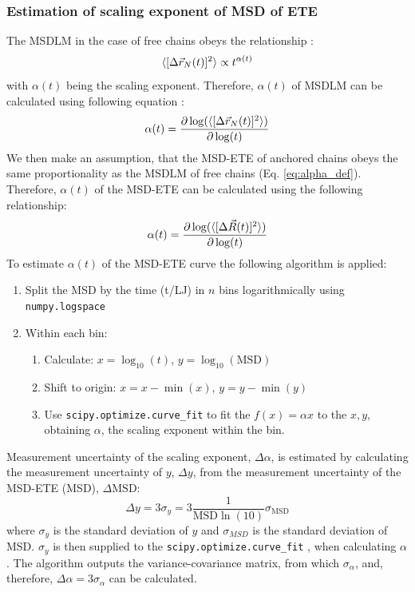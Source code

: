 \documentclass[
    paper=A4,pagesize=automedia,fontsize=12pt,
    BCOR=15mm,DIV=22,
    twoside,headinclude,footinclude=false,
    fleqn,             %
    bibliography=totocnumbered,          %
    listof=totoc,                %
    listof=flat,                 %
    cleardoublepage=empty      %
    numbers=endperiod
]{scrartcl}
\begin{document}
\subsubsection{Estimation of scaling exponent of MSD of ETE} \label{sec:est-alpha-msd}
The MSDLM in the case of free chains obeys the relationship \cite{Singh:2022}:
\begin{equation} \label{eq:alpha_def}
    \langle[\Delta \vec{r}_N(t)]^2\rangle \propto t^{\alpha(t)}
\end{equation}
with $\alpha(t)$ being the scaling exponent. 
Therefore, $\alpha(t)$ of MSDLM can be calculated
using following equation \cite{Singh:2022}:
\begin{equation} \label{eq:alpha_estimation_msdlm}
    \alpha(t) = \frac {\partial \log(\langle[\Delta \vec{r}_N(t)]^2\rangle)}{\partial \log(t)}
\end{equation}
We then make an assumption, that the MSD-ETE of anchored chains 
obeys the same proportionality as the MSDLM of free chains (Eq. \ref{eq:alpha_def}).
Therefore, $\alpha(t)$ of the MSD-ETE can be calculated using the following relationship:
\begin{equation} \label{eq:alpha_estimation_msdete}
    \alpha(t) = \frac {\partial \log(\langle[\Delta \vec{R}(t)]^2\rangle)}{\partial \log(t)}
\end{equation}
To estimate $\alpha(t)$ of the MSD-ETE curve the following
algorithm is applied:
\begin{enumerate}
    \item Split the MSD by the time (t/LJ) in $n$ bins logarithmically using
    \texttt{numpy.logspace} \cite{harris2020array}
    \item Within each bin:
    \begin{enumerate}
        \item Calculate: $x=\log_{10}(t)$, $y=\log_{10}(\text{MSD})$
        \item Shift to origin: $x=x-\min(x)$, $y=y-\min(y)$
        \item Use \texttt{scipy.optimize.curve_fit} 
        \cite{2020SciPy-NMeth} to fit the $f(x) = \alpha x$ to the $x,y$,
        obtaining $\alpha$, the scaling exponent within the bin.
    \end{enumerate}
\end{enumerate}  
Measurement uncertainty of the scaling exponent, $\Delta \alpha$, is estimated 
by calculating the measurement uncertainty of $y$, $\Delta y$, from the 
measurement uncertainty of the MSD-ETE (MSD), $\Delta \text{MSD}$:
\begin{equation}
    \Delta y = 3 \sigma_y = 3 \frac{1}{\text{MSD} \ln(10)} \sigma_{\text{MSD}}
\end{equation}
where $\sigma_y$ is the standard deviation of $y$ and $\sigma_{MSD}$ is 
the standard deviation of MSD.  
$\sigma_y$ is then supplied to the  
\texttt{scipy.optimize.curve_fit} \cite{2020SciPy-NMeth},
when calculating $\alpha$. The algorithm outputs the variance-covariance
matrix, from which $\sigma_{\alpha}$, and, therefore, 
$\Delta \alpha = 3 \sigma_{\alpha}$ can be calculated.
\end{document}
